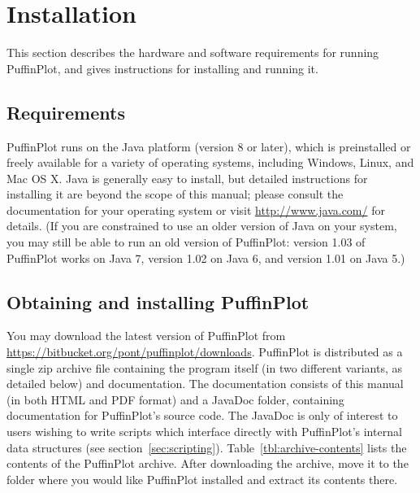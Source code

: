 \documentclass[a4paper,british]{article}
\begin{document}
\section{Installation}

This section describes the hardware and software requirements for
running PuffinPlot, and gives instructions for installing and running
it.

\subsection{Requirements}

PuffinPlot runs on the Java platform (version 8 or later), which is
preinstalled or freely available for a variety of operating systems,
including Windows, Linux, and Mac OS X. Java is generally easy to
install, but detailed instructions for installing it are beyond the
scope of this manual; please consult the documentation for your
operating system or visit \url{http://www.java.com/} for details. (If
you are constrained to use an older version of Java on your system, you
may still be able to run an old version of PuffinPlot: version 1.03 of
PuffinPlot works on Java 7, version 1.02 on Java 6, and version 1.01 on
Java 5.)

\subsection{Obtaining and installing PuffinPlot}

You may download the latest version of PuffinPlot from
\url{https://bitbucket.org/pont/puffinplot/downloads}. PuffinPlot is
distributed as a single zip archive file containing the program itself
(in two different variants, as detailed below) and documentation. The
documentation consists of this manual (in both HTML and PDF format) and
a JavaDoc folder, containing documentation for PuffinPlot's source code.
The JavaDoc is only of interest to users wishing to write scripts which
interface directly with PuffinPlot's internal data structures (see
section~\ref{sec:scripting}). Table~\ref{tbl:archive-contents} lists the
contents of the PuffinPlot archive. After downloading the archive, move
it to the folder where you would like PuffinPlot installed and extract
its contents there.
\end{document}
